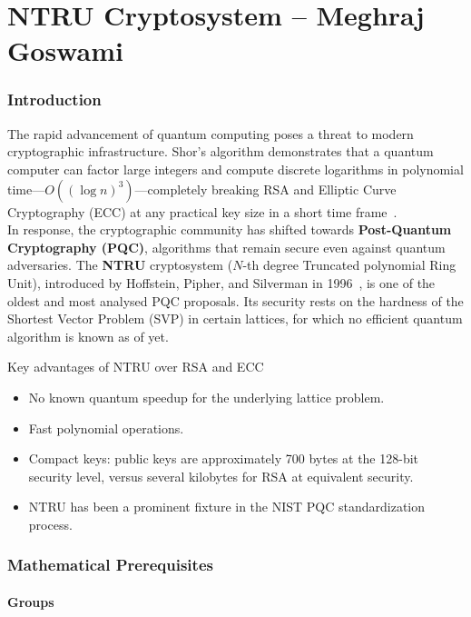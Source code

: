 \documentclass[12pt, a4paper]{article}
\theoremstyle{definition}
\theoremstyle{plain}
\begin{document}
\part{NTRU Cryptosystem -- Meghraj Goswami}

\section{Introduction}

The rapid advancement of quantum computing poses a threat to modern cryptographic infrastructure. Shor's algorithm demonstrates that a quantum computer can factor large integers and compute discrete logarithms in polynomial time---$O((\log n)^3)$---completely breaking RSA and Elliptic Curve Cryptography (ECC) at any practical key size in a short time frame~\cite{shor94}.\\

In response, the cryptographic community has shifted towards \textbf{Post-Quantum Cryptography (PQC)}, algorithms that remain secure even against quantum adversaries. The \textbf{NTRU} cryptosystem ($N$-th degree Truncated polynomial Ring Unit), introduced by Hoffstein, Pipher, and Silverman in 1996~\cite{ntru96}, is one of the oldest and most analysed PQC proposals. Its security rests on the hardness of the Shortest Vector Problem (SVP) in certain lattices, for which no efficient quantum algorithm is known as of yet.

Key advantages of NTRU over RSA and ECC\:
\begin{itemize}
    \item No known quantum speedup for the underlying lattice problem.
    \item Fast polynomial operations.
    \item Compact keys: public keys are approximately 700 bytes at the 128-bit security level, versus several kilobytes for RSA at equivalent security.
    \item NTRU has been a prominent fixture in the NIST PQC standardization process.\cite{nistpqc}
\end{itemize}

\section{Mathematical Prerequisites}

\subsection{Groups}
\end{document}

